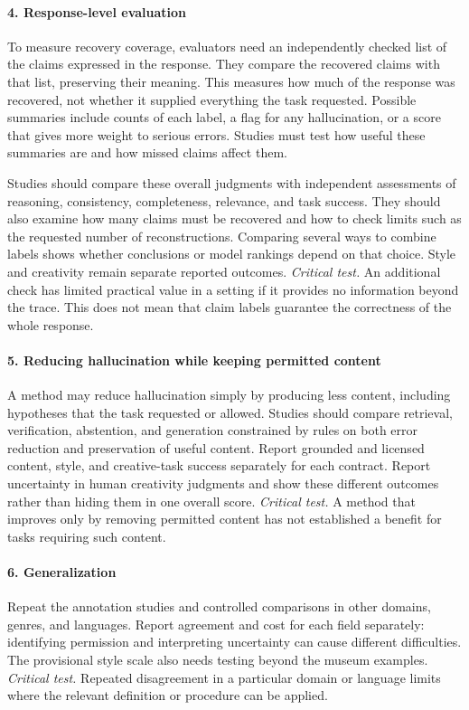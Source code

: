 \documentclass{clv2025}
\begin{document}
\paragraph{4. Response-level evaluation}
To measure recovery coverage, evaluators need an independently checked list
of the claims expressed in the response. They compare the recovered claims
with that list, preserving their meaning. This measures how much of the
response was recovered, not whether it supplied everything the task requested.
Possible summaries include counts of each label, a flag for any hallucination,
or a score that gives more weight to serious errors. Studies must test how
useful these summaries are and how missed claims affect them.

Studies should compare these overall judgments with independent assessments of
reasoning, consistency, completeness, relevance, and task success. They should
also examine how many claims must be recovered and how to check limits such
as the requested number of reconstructions. Comparing several ways to combine
labels shows whether conclusions or model rankings depend on that choice.
Style and creativity remain separate reported outcomes.
\emph{Critical test.} An additional check has limited practical value in a
setting if it provides no information beyond the trace. This does not mean
that claim labels guarantee the correctness of the whole response.

\paragraph{5. Reducing hallucination while keeping permitted content}
A method may reduce hallucination simply by producing less content,
including hypotheses that the task requested or allowed. Studies should
compare retrieval, verification, abstention, and generation constrained by
rules on both error reduction and preservation of useful content. Report
grounded and licensed content, style, and creative-task success separately
for each contract. Report uncertainty in human creativity judgments and
show these different outcomes rather than hiding them in one overall score.
\emph{Critical test.} A method that improves only by removing permitted
content has not established a benefit for tasks requiring such content.

\paragraph{6. Generalization}
Repeat the annotation studies and controlled comparisons in other domains,
genres, and languages. Report agreement and cost for each field separately:
identifying permission and interpreting uncertainty can cause different
difficulties. The provisional style scale also needs testing beyond the
museum examples.
\emph{Critical test.} Repeated disagreement in a particular domain or
language limits where the relevant definition or procedure can be applied.
\end{document}
